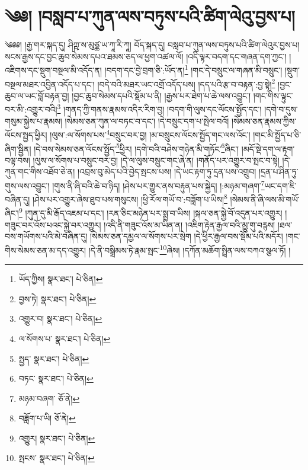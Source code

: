 \setcounter{footnote}{0} 
\chapter{༄༅། །བསླབ་པ་ཀུན་ལས་བཏུས་པའི་ཚིག་ལེའུ་བྱས་པ།}༄༅༅། །རྒྱ་གར་སྐད་དུ། ཤིཀྵ་ས་མུཙྪ་ཡ་ཀཱ་རི་ཀཱ། བོད་སྐད་དུ། བསླབ་པ་ཀུན་ལས་བཏུས་པའི་ཚིག་ལེའུར་བྱས་པ། སངས་རྒྱས་དང་བྱང་ཆུབ་སེམས་དཔའ་ཐམས་ཅད་ལ་ཕྱག་འཚལ་ལོ། །འདི་ལྟར་བདག་དང་གཞན་དག་ཀྱང་། །འཇིགས་དང་སྡུག་བསྔལ་མི་འདོད་ན། །བདག་དང་བྱེ་བྲག་ཅི་:ཡོད་ན།\footnote{ཡོད་ཀྱིས།  སྣར་ཐང་།  པེ་ཅིན། } །གང་དེ་བསྲུང་ལ་གཞན་མི་བསྲུང་། །སྡུག་བསྔལ་མཐར་འབྱིན་འདོད་པ་དང་། །བདེ་བའི་མཐར་ཡང་འགྲོ་འདོད་པས། །དད་པའི་རྩ་བ་བརྟན་:བྱ་སྟེ།\footnote{བྱས་ཏེ།  སྣར་ཐང་།  པེ་ཅིན། } །བྱང་ཆུབ་ལ་ཡང་བློ་བརྟན་བྱ། །བྱང་ཆུབ་སེམས་དཔའི་སྡོམ་པ་ནི། །རྒྱས་པར་ཐེག་པ་ཆེ་ལས་འབྱུང་། །གང་གིས་ལྟུང་བར་མི་:འགྱུར་བའི།\footnote{འགྱུར་བ།  སྣར་ཐང་།  པེ་ཅིན། } །གནད་ཀྱི་གནས་རྣམས་འདིར་རིག་བྱ། །བདག་གི་ལུས་དང་ལོངས་སྤྱོད་དང་། །དགེ་བ་དུས་གསུམ་སྐྱེས་པ་རྣམས། །སེམས་ཅན་ཀུན་ལ་བཏང་བ་དང་། །དེ་བསྲུང་དག་པ་སྤེལ་བའོ། །སེམས་ཅན་རྣམས་ཀྱིས་ལོངས་སྤྱད་ཕྱིར། །ལུས་:ལ་སོགས་པས་\footnote{ལ་སོགས་པ་  སྣར་ཐང་།  པེ་ཅིན། }བསྲུང་བར་བྱ། །མ་བསྲུངས་ལོངས་སྤྱོད་གང་ལས་འོང་། །གང་མི་སྤྱོད་པ་ཅི་ཞིག་སྦྱིན། །དེ་བས་སེམས་ཅན་ལོངས་སྤྱོད་\footnote{སྤྱད་  སྣར་ཐང་།  པེ་ཅིན། }ཕྱིར། །དགེ་བའི་བཤེས་གཉེན་མི་གཏོང་\footnote{བཏང་  སྣར་ཐང་།  པེ་ཅིན། }ཞིང་། །མདོ་སྡེ་དག་ལ་རྟག་བལྟ་བས། །ལུས་ལ་སོགས་པ་བསྲུང་བར་བྱ། །དེ་ལ་ལུས་བསྲུང་གང་ཞེ་ན། །གནོད་པར་འགྱུར་བ་སྤང་བ་སྟེ། །དེ་ཀུན་གང་གིས་འཐོབ་ཅེ་ན། །འབྲས་བུ་མེད་པའི་བྱེད་སྤངས་པས། །དེ་ཡང་རྟག་ཏུ་དྲན་པས་འགྲུབ། །དྲན་པ་ཤིན་ཏུ་གུས་ལས་འབྱུང་། །གུས་ནི་ཞི་བའི་ཆེ་བ་ཉིད། །ཤེས་པར་གྱུར་ནས་བརྟུན་པས་སྐྱེད། །:མཉམ་གཞག་\footnote{མཉམ་བཞག་  ཅོ་ནེ། }ཡང་དག་ཇི་བཞིན་དུ། །ཤེས་པར་འགྱུར་ཞེས་ཐུབ་པས་གསུངས། །ཕྱི་རོལ་གཡོ་བ་:བཟློག་པ་ཡིས།\footnote{བཟློག་པ་ཡི།  ཅོ་ནེ། } །སེམས་ནི་ཞི་ལས་མི་གཡོ་ཞིང་།\footnote{འགྱུར།  སྣར་ཐང་།  པེ་ཅིན། } །ཀུན་དུ་མི་རྒོད་འཇམ་པ་དང་། །རན་ཅིང་མཉེན་པར་སྨྲ་བ་ཡིས། །སྐལ་ཅན་སྐྱེ་བོ་འདུན་པར་འགྱུར། །གཟུང་བར་འོས་པའང་སྐྱེ་བར་འགྱུར། །འདི་ནི་གཟུང་འོས་མ་ཡིན་ན། །འཇིག་རྟེན་རྒྱལ་བའི་མྱུ་གུ་བརྙས། །ཐལ་བས་གཡོགས་པའི་མེ་བཞིན་དུ། །སེམས་ཅན་དམྱལ་ལ་སོགས་པར་སྲེག །དེ་ཕྱིར་རྒྱལ་བས་སྡོམ་པའི་མདོར། །གང་གིས་སེམས་ཅན་མ་དད་འགྱུར། །དེ་ནི་བསྒྲིམས་ཏེ་རྣམ་སྤང་\footnote{སྤངས་  སྣར་ཐང་།  པེ་ཅིན། }ཞེས། །དཀོན་མཆོག་སྤྲིན་ལས་བཀའ་སྩལ་ཏོ། །
